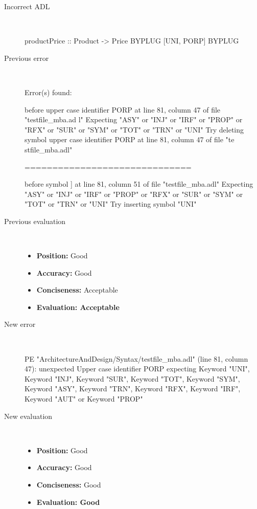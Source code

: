 \hrulefill

\begin{description}
  \item[Incorrect ADL]~\\
\begin{adl}
productPrice :: Product -> Price BYPLUG [UNI, PORP] BYPLUG \end{adl}
  \item[Previous error]~\\
\begin{haskell}
Error(s) found:

before upper case identifier PORP at line 81, column 47 of file "testfile_mba.ad
l"
Expecting "ASY" or "INJ" or "IRF" or "PROP" or "RFX" or "SUR" or "SYM" or "TOT"
or "TRN" or "UNI"
Try deleting symbol upper case identifier PORP at line 81, column 47 of file "te
stfile_mba.adl"

==============================

before symbol ] at line 81, column 51 of file "testfile_mba.adl"
Expecting "ASY" or "INJ" or "IRF" or "PROP" or "RFX" or "SUR" or "SYM" or "TOT"
or "TRN" or "UNI"
Try inserting symbol "UNI"

\end{haskell}
  \item[Previous evaluation]~\\
    \begin{itemize}
    \item \textbf{Position:} Good
    \item \textbf{Accuracy:} Good
    \item \textbf{Conciseness:} Acceptable
    \item \textbf{Evaluation: Acceptable}
    \end{itemize}
  \item[New error]~\\
\begin{haskell}
PE "ArchitectureAndDesign/Syntax/testfile_mba.adl" (line 81, column 47):
unexpected Upper case identifier PORP
expecting Keyword "UNI", Keyword "INJ", Keyword "SUR", Keyword "TOT", Keyword "SYM", Keyword "ASY", Keyword "TRN", Keyword "RFX", Keyword "IRF", Keyword "AUT" or Keyword "PROP"\end{haskell}
  \item[New evaluation]~\\
    \begin{itemize}
    \item \textbf{Position:} Good
    \item \textbf{Accuracy:} Good
    \item \textbf{Conciseness:} Good
    \item \textbf{Evaluation: Good}
    \end{itemize}
  \end{description}

